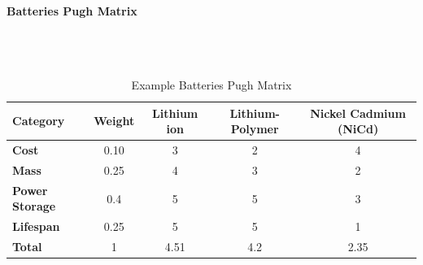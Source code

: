 \paragraph{Batteries Pugh Matrix} ~\\ ~\\
\begin{table}[H]
\centering
\begin{tabular}{|l|c|c|c|c|} 
\hline
    \textbf{Category} & \textbf{Weight} & \textbf{Lithium ion} & \textbf{Lithium-Polymer} & \textbf{Nickel Cadmium (NiCd)}
    \\
\hline
    \textbf{Cost} & 0.10 & 3 & 2 & 4
    \\
\hline
    \textbf{Mass} & 0.25 & 4 & 3 & 2
    \\
\hline
    \textbf{Power Storage} & 0.4 & 5 & 5 & 3
    \\
\hline
    \textbf{Lifespan} & 0.25 & 5 & 5 & 1
    \\
\hline
    \textbf{Total} & 1 & 4.51 & 4.2 & 2.35
    \\
\hline
\end{tabular}
\caption{Example Batteries Pugh Matrix }
\label{tbl:Batteries_Pugh}
\end{table}

